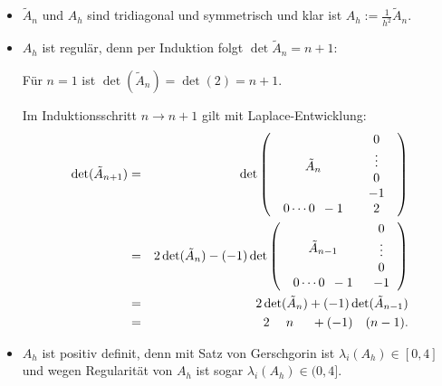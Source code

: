 \documentclass{book}
\newcommand{\assign}{:=}
\newcommand{\tmdummy}{$\mbox{}$}
\newenvironment{itemizedot}{\begin{itemize} \renewcommand{\labelitemi}{$\bullet$}\renewcommand{\labelitemii}{$\bullet$}\renewcommand{\labelitemiii}{$\bullet$}\renewcommand{\labelitemiv}{$\bullet$}}{\end{itemize}}
\begin{document}
\begin{remark*}
  {\tmdummy}
  
  \begin{itemizedot}
    \item $\tilde{A}_n$ und $A_h$ sind tridiagonal und symmetrisch und klar
    ist $A_h \assign \frac{1}{h^2} \tilde{A}_n$.
    
    \item $A_h$ ist regul{\"a}r, denn per Induktion folgt $\det \tilde{A}_n =
    n + 1$:
    
    F{\"u}r $n = 1$ ist $\det (\tilde{A}_n) = \det (2) = n + 1$.
    
    Im Induktionsschritt $n \rightarrow n + 1$ gilt mit Laplace-Entwicklung:
    \begin{eqnarray*}
      \det (\tilde{A}_{n + 1}) & = & \det \left(\begin{array}{cc}
        \tilde{A}_n & \begin{array}{c}
          0\\
          \vdots\\
          0\\
          - 1
        \end{array}\\
        \begin{array}{l}
          0 \cdots 0 \enspace - 1
        \end{array} & 2
      \end{array}\right)\\
      & = & 2 \det (\tilde{A}_n) - (- 1) \det \left(\begin{array}{cc}
        \tilde{A}_{n - 1} & \begin{array}{c}
          0\\
          \vdots\\
          0
        \end{array}\\
        \begin{array}{l}
          0 \cdots 0 \enspace - 1
        \end{array} & - 1
      \end{array}\right)\\
      & = & 2 \det (\tilde{A}_n) + (- 1) \det (\tilde{A}_{n - 1})\\
      & = & 2 \hspace{1.3em} n \hspace{1.4em} + (- 1) \quad (n - 1) .
    \end{eqnarray*}
    \item $A_h$ ist positiv definit, denn mit Satz von Gerschgorin ist
    $\lambda_i (A_h) \in [0, 4]$ und wegen Regularit{\"a}t von $A_h$ ist sogar
    $\lambda_i (A_h) \in (0, 4]$.
    

\end{itemizedot}
\end{remark*}
\end{document}
